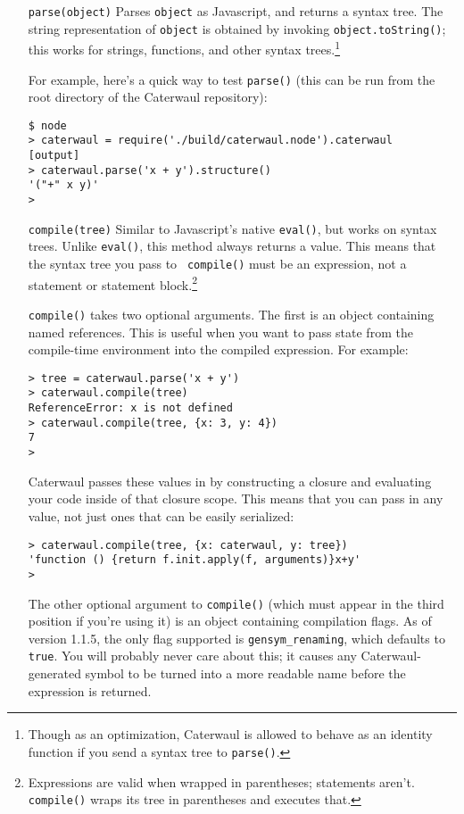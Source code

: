 \documentclass{report}
\begin{document}
\begin{enumerate}
\item[{\tt parse(object)}]
  Parses {\tt object} as Javascript, and returns a syntax tree. The string representation of {\tt object} is obtained by invoking {\tt object.toString()}; this works for strings,
  functions, and other syntax trees.\footnote{Though as an optimization, Caterwaul is allowed to behave as an identity function if you send a syntax tree to {\tt parse()}.}

  For example, here's a quick way to test {\tt parse()} (this can be run from the root directory of the Caterwaul repository):

\begin{verbatim}
$ node
> caterwaul = require('./build/caterwaul.node').caterwaul
[output]
> caterwaul.parse('x + y').structure()
'("+" x y)'
>
\end{verbatim}

\item[{\tt compile(tree)}]
  Similar to Javascript's native {\tt eval()}, but works on syntax trees. Unlike {\tt eval()}, this method always returns a value. This means that the syntax tree you pass to {\tt
  compile()} must be an expression, not a statement or statement block.\footnote{Expressions are valid when wrapped in parentheses; statements aren't. {\tt compile()} wraps its tree in
  parentheses and executes that.}

  {\tt compile()} takes two optional arguments. The first is an object containing named references. This is useful when you want to pass state from the compile-time environment into the
  compiled expression. For example:

\begin{verbatim}
> tree = caterwaul.parse('x + y')
> caterwaul.compile(tree)
ReferenceError: x is not defined
> caterwaul.compile(tree, {x: 3, y: 4})
7
>
\end{verbatim}

  Caterwaul passes these values in by constructing a closure and evaluating your code inside of that closure scope. This means that you can pass in any value, not just ones that can be
  easily serialized:

\begin{verbatim}
> caterwaul.compile(tree, {x: caterwaul, y: tree})
'function () {return f.init.apply(f, arguments)}x+y'
>
\end{verbatim}

  The other optional argument to {\tt compile()} (which must appear in the third position if you're using it) is an object containing compilation flags. As of version 1.1.5, the only flag
  supported is \verb|gensym_renaming|, which defaults to {\tt true}. You will probably never care about this; it causes any Caterwaul-generated symbol to be turned into a more readable
  name before the expression is returned.
\end{enumerate}
\end{document}
